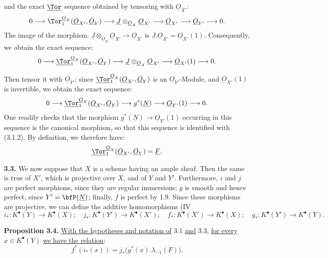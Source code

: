 %
and the exact \(\underline{\Tor}\) sequence obtained by tensoring with \(\underline{O}_{X'}\):
\[
0\longrightarrow
\Tor_1^{\underline{O}_X}(\underline{O}_{X'},\underline{O}_Y)
\longrightarrow
\underline{J}\otimes_{\underline{O}_X}\underline{O}_{X'}
\longrightarrow
\underline{O}_{X'}
\longrightarrow
\underline{O}_{Y'}
\longrightarrow0.
\]
The image of the morphism: \(\underline{J}\otimes_{\underline{O}_X}\underline{O}_{X'}\to\underline{O}_{X'}\) is
\(\underline{J}.\underline{O}_{X'}=\underline{O}_{X'}(1)\). Consequently, we obtain the exact sequence:
\[
0\longrightarrow
\underline{\Tor}_1^{\underline{O}_X}(\underline{O}_{X'},\underline{O}_Y)
\longrightarrow
\underline{J}\otimes_{\underline{O}_X}\underline{O}_{X'}
\longrightarrow
\underline{O}_{X'}(1)
\longrightarrow0.
\]

Then tensor it with \(\underline{O}_{Y'}\); since
\(\underline{\Tor}_1^{\underline{O}_X}(\underline{O}_{X'},\underline{O}_Y)\) is an \(\underline{O}_{Y'}\)-Module, and
\(\underline{O}_{X'}(1)\) is invertible, we obtain the exact sequence:
\[
0\longrightarrow
\underline{\Tor}_1^{\underline{O}_X}(\underline{O}_{X'},\underline{O}_Y)
\longrightarrow
g^*(\underline{N})
\longrightarrow
\underline{O}_{Y'}(1)
\longrightarrow0.
\]
One readily checks that the morphism \(g^*(\underline{N})\to\underline{O}_{Y'}(1)\) occurring in this sequence is the canonical morphism, so that this sequence is identified with (3.1.2). By definition, we therefore have:
\[
\underline{\Tor}_1^{\underline{O}_X}(\underline{O}_{X'},\underline{O}_Y)=\underline{F}.
\]

\textbf{3.3.} We now suppose that \(X\) is a scheme having an ample sheaf. Then the same is true of \(X'\), which is projective over \(X\), and of \(Y\) and \(Y'\). Furthermore, \(i\) and \(j\) are perfect morphisms, since they are regular immersions; \(g\) is smooth and hence perfect, since \(Y'=\bfP(\underline{N})\); finally, \(f\) is perfect by 1.9. Since these morphisms are projective, we can define the additive homomorphisms (IV
\[
i_*:K^{\bullet}(Y)\to K^{\bullet}(X);\quad
j_*:K^{\bullet}(Y')\to K^{\bullet}(X');\quad
f_*:K^{\bullet}(X')\to K^{\bullet}(X);\quad
g_*:K^{\bullet}(Y')\to K^{\bullet}(Y).
\]

%
\textbf{Proposition 3.4.} \uline{With the hypotheses and notation of} 3.1 \uline{and} 3.3, \uline{for every} \(x\in K^{\bullet}(Y)\) \uline{we have the relation}:
\[
f^*(i_*(x))=j_*\bigl(g^*(x).\lambda_{-1}(F)\bigr).
\]

